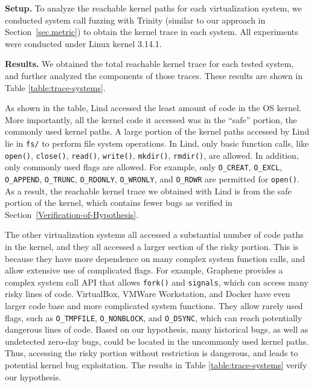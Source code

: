 {{{\textbf{Setup.}
To analyze the reachable kernel paths for each 
virtualization system,
we conducted system call fuzzing with Trinity (similar to our approach in Section~{\ref{sec.metric}}) to obtain
the kernel trace in each system. 
All experiments were conducted under Linux kernel 3.14.1.

\noindent
\textbf{Results.}
We obtained the total reachable kernel trace for
each tested system, %
and further analyzed the components of those traces. These results
are shown in Table \ref{table:trace-systems}.

As shown in the table, Lind accessed the least amount of code in the OS
kernel. More importantly,
all the kernel code it accessed was in the ``safe'' portion, the
commonly used kernel paths.
A large portion of the kernel paths accessed by Lind lie in
\texttt{fs/} to perform file system operations.
In Lind, only basic function calls,
like \texttt{open()}, \texttt{close()}, \texttt{read()}, \texttt{write()}, \texttt{mkdir()},
\texttt{rmdir()}, are allowed. In addition, only commonly used flags are allowed. For example,
only \texttt{O\_CREAT}, \texttt{O\_EXCL}, \texttt{O\_APPEND}, \texttt{O\_TRUNC},
\texttt{O\_RDONLY}, \texttt{O\_WRONLY}, and \texttt{O\_RDWR} are permitted for \texttt{open()}.
As a result, the reachable kernel trace we obtained with Lind is from the safe
portion of the kernel, which contains fewer bugs
as verified in Section~{\ref{Verification-of-Hypothesis}}.

The other virtualization systems all accessed a substantial number of code
paths in the kernel,
and they all accessed a larger section of the risky portion.
This is because they have
more dependence on many complex system function calls, and
allow extensive use of complicated flags. For example,
Graphene provides a complex system call API that allows
\texttt{fork()} and \texttt{signals}, which can access many risky lines of code.
VirtualBox, VMWare Workstation, and Docker have even larger
code base and more complicated system functions. They allow
rarely used flags, such as \texttt{O\_TMPFILE}, \texttt{O\_NONBLOCK},
and \texttt{O\_DSYNC}, which can reach potentially dangerous lines
of code.
%
Based on our hypothesis, many historical bugs, as well as undetected
zero-day bugs, could be located in the uncommonly used kernel paths.
Thus, accessing the risky portion without restriction is dangerous, and
leads to potential kernel bug exploitation. The results in Table
\ref{table:trace-systems} verify our hypothesis.

}}}
